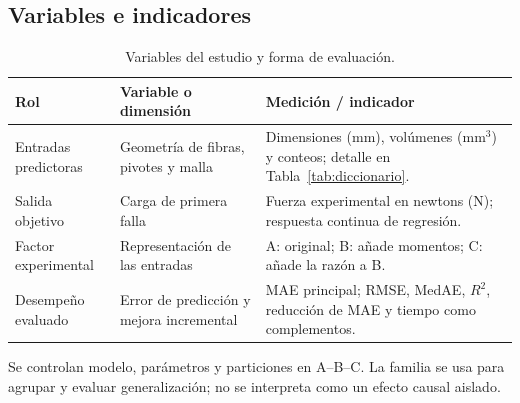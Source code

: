\subsection{Variables e indicadores}
\begin{table}[htbp]
\centering\small{}
\caption{Variables del estudio y forma de evaluación.}
\label{tab:variables-indicadores}
\begin{tabularx}{\linewidth}{@{}p{2.8cm}YY@{}}
\toprule
{}
Rol & Variable o dimensión & Medición / indicador \\
\midrule
Entradas predictoras & Geometría de fibras, pivotes y malla & Dimensiones (mm), volúmenes (mm$^3$) y conteos; detalle en Tabla~\ref{tab:diccionario}. \\
\addlinespace
Salida objetivo & Carga de primera falla & Fuerza experimental en newtons (N); respuesta continua de regresión. \\
\addlinespace
Factor experimental & Representación de las entradas & A: original; B: añade momentos; C: añade la razón a B. \\
\addlinespace
Desempeño evaluado & Error de predicción y mejora incremental & MAE principal; RMSE, MedAE, $R^2$, reducción de MAE y tiempo como complementos. \\
\bottomrule
\end{tabularx}
\end{table}

\noindent Se controlan modelo, parámetros y particiones en A--B--C. La familia se usa para agrupar y evaluar generalización; no se interpreta como un efecto causal aislado.
\FloatBarrier
